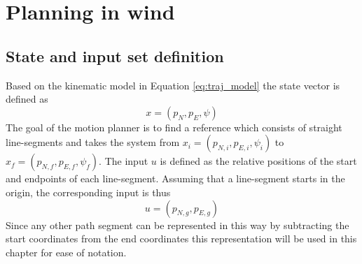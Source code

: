 \chapter{Planning in wind}\label{cha:motion_planning_fw}
\section{State and input set definition}
Based on the kinematic model in Equation \eqref{eq:traj_model} the state vector is defined as
\begin{equation}
    x=(p_N, p_E, \psi)
\end{equation}
The goal of the motion planner is to find a reference which consists of straight line-segments and takes the system from 
$x_i=(p_{N,i},p_{E,i},\psi_i)$ to $x_f=(p_{N,f},p_{E,f},\psi_f)$. 
The input $u$ is defined as the relative positions of the start and endpoints of each line-segment. Assuming that a 
line-segment starts in the origin, the corresponding input is thus 
\begin{equation}
    u=(p_{N,g}, p_{E,g})
\end{equation}
Since any other path segment can be represented in this way by subtracting the start coordinates from the end coordinates this 
representation will be used in this chapter for ease of notation.
